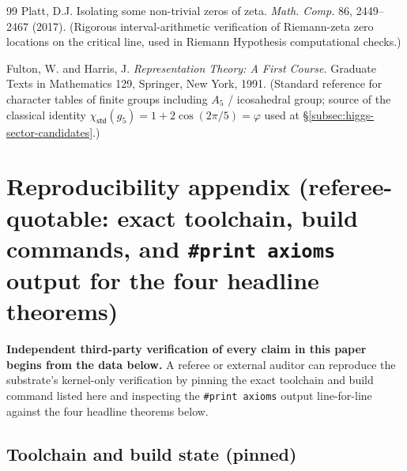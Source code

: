 \documentclass[11pt,a4paper]{amsart}
\theoremstyle{plain}
\theoremstyle{definition}
\begin{document}
\begin{thebibliography}{99}
Platt, D.J.
\newblock Isolating some non-trivial zeros of zeta.
\newblock \emph{Math. Comp.} 86, 2449--2467 (2017). (Rigorous interval-arithmetic verification of Riemann-zeta zero locations on the critical line, used in Riemann Hypothesis computational checks.)

Fulton, W. and Harris, J.
\newblock \emph{Representation Theory: A First Course.}
\newblock Graduate Texts in Mathematics 129, Springer, New York, 1991. (Standard reference for character tables of finite groups including $A_5$ / icosahedral group; source of the classical identity $\chi_{\textsf{std}}(g_5) = 1 + 2\cos(2\pi/5) = \varphi$ used at \S\ref{subsec:higgs-sector-candidates}.)

\end{thebibliography}

\appendix
\section{Reproducibility appendix (referee-quotable: exact toolchain, build commands, and \texttt{\#print axioms} output for the four headline theorems)}\label{sec:reproducibility-appendix}

\textbf{Independent third-party verification of every claim in this paper begins from the data below.} A referee or external auditor can reproduce the substrate's kernel-only verification by pinning the exact toolchain and build command listed here and inspecting the \texttt{\#print axioms} output line-for-line against the four headline theorems below.

\subsection{Toolchain and build state (pinned)}\label{subsec:repro-toolchain}
\end{document}
